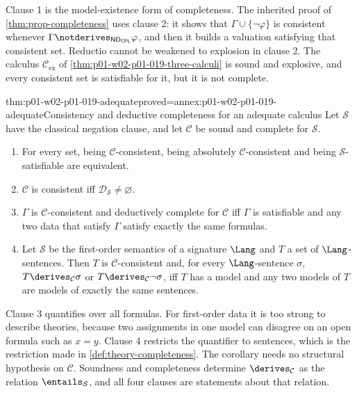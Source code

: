 Clause 1 is the model-existence form of completeness. The inherited proof of
\cref{thm:prop-completeness} uses clause 2: it shows that
\(\Gamma\cup\{\neg\varphi\}\) is consistent whenever
\(\Gamma\notderives_{\mathsf{ND}_{\mathsf{CPL}}}\varphi\), and then it builds a
valuation satisfying that consistent set. Reductio cannot be weakened to
explosion in clause 2. The calculus \(\mathcal C_{\mathrm{ex}}\) of
\cref{thm:p01-w02-p01-019-three-calculi} is sound and explosive, and every
consistent set is satisfiable for it, but it is not complete.

\begin{hbcorollary}{thm:p01-w02-p01-019-adequate}{proved=annex:p01-w02-p01-019-adequate}{Consistency and deductive completeness for an adequate calculus}
Let \(\mathcal S\) have the classical negation clause, and let \(\mathcal C\)
be sound and complete for \(\mathcal S\).
\begin{enumerate}
  \item For every set, being \(\mathcal C\)-consistent, being absolutely
        \(\mathcal C\)-consistent and being \(\mathcal S\)-satisfiable are
        equivalent.
  \item \(\mathcal C\) is consistent iff
        \(\mathcal D_{\mathcal S}\neq\varnothing\).
  \item \(\Gamma\) is \(\mathcal C\)-consistent and deductively complete for
        \(\mathcal C\) iff \(\Gamma\) is satisfiable and any two data that
        satisfy \(\Gamma\) satisfy exactly the same formulas.
  \item Let \(\mathcal S\) be the first-order semantics of a signature
        \(\Lang\) and \(T\) a set of \(\Lang\)-sentences. Then \(T\) is
        \(\mathcal C\)-consistent and, for every \(\Lang\)-sentence
        \(\sigma\), \(T\derives_{\mathcal C}\sigma\) or
        \(T\derives_{\mathcal C}\neg\sigma\), iff \(T\) has a model and any
        two models of \(T\) are models of exactly the same sentences.
\end{enumerate}
\end{hbcorollary}

Clause 3 quantifies over all formulas. For first-order data it is too strong
to describe theories, because two assignments in one model can disagree on an
open formula such as \(x=y\). Clause 4 restricts the quantifier to sentences,
which is the restriction made in \cref{def:theory-completeness}. The
corollary needs no structural hypothesis on \(\mathcal C\). Soundness and completeness determine
\(\derives_{\mathcal C}\) as the relation \(\entails_{\mathcal S}\), and all
four clauses are statements about that relation.

